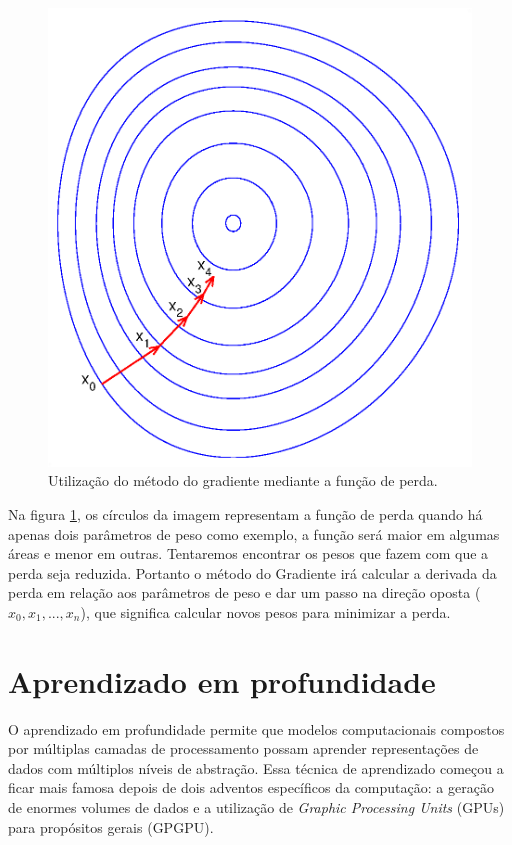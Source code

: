 \begin{figure}[H]
\centering
\includegraphics[scale=0.6]{imagens/Gradient_descent.eps}
\caption{Utilização do método do gradiente mediante a função de perda.}
\label{fig:gradient_descent}
\end{figure}

Na figura \ref{fig:gradient_descent}, os círculos da imagem
representam a função de perda quando há apenas dois parâmetros de peso
como exemplo, a função será maior em algumas áreas e menor em
outras. Tentaremos encontrar os pesos que fazem com que a perda seja
reduzida. Portanto o método do Gradiente irá calcular a derivada da
perda em relação aos parâmetros de peso e dar um passo na direção
oposta ($x_0,x_1,...,x_n$), que significa calcular novos pesos para
minimizar a perda.

\section{Aprendizado em profundidade}

O aprendizado em profundidade permite que modelos computacionais
compostos por múltiplas camadas de processamento possam aprender
representações de dados com múltiplos níveis de abstração\cite{LeCun}.
Essa técnica de aprendizado começou a ficar mais famosa depois de dois
adventos específicos da computação: a geração de enormes volumes de
dados e a utilização de \textit{Graphic Processing Units} (GPUs) para
propósitos gerais (GPGPU).

